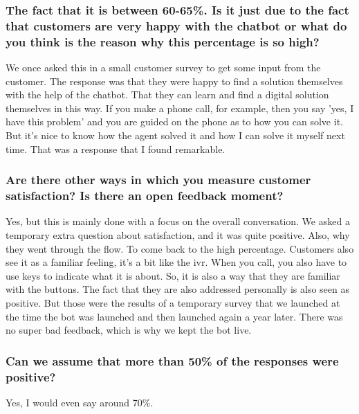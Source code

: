 \begin{appendices}
	\subsubsection{The fact that it is between 60-65\%. Is it just due to the fact that customers are very happy with the chatbot or what do you think is the reason why this percentage is so high?}
	We once asked this in a small customer survey to get some input from the customer. The response was that they were happy to find a solution themselves with the help of the chatbot. That they can learn and find a digital solution themselves in this way. If you make a phone call, for example, then you say 'yes, I have this problem' and you are guided on the phone as to how you can solve it. But it's nice to know how the agent solved it and how I can solve it myself next time. That was a response that I found remarkable.
	
	\subsubsection{Are there other ways in which you measure customer satisfaction? Is there an open feedback moment?}
	Yes, but this is mainly done with a focus on the overall conversation. We asked a temporary extra question about satisfaction, and it was quite positive. Also, why they went through the flow. To come back to the high percentage. Customers also see it as a familiar feeling, it's a bit like the \gls{ivr}. When you call, you also have to use keys to indicate what it is about. So, it is also a way that they are familiar with the buttons. The fact that they are also addressed personally is also seen as positive. But those were the results of a temporary survey that we launched at the time the bot was launched and then launched again a year later. There was no super bad feedback, which is why we kept the bot live.
	
	\subsubsection{Can we assume that more than 50\% of the responses were positive?}
	Yes, I would even say around 70\%.
	

\end{appendices}
